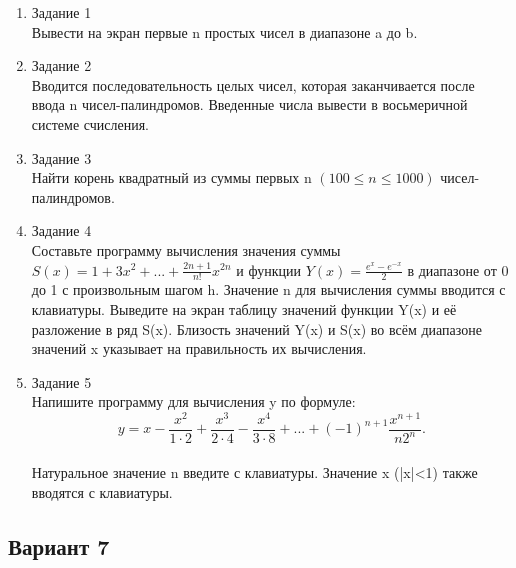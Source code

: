 \documentclass[a4paper]{article}
\begin{document}
	\begin{enumerate} 
		\item Задание 1 \\
			Вывести на экран первые n простых чисел в диапазоне a до b.\\
		\item Задание 2\\
			Вводится последовательность целых чисел, которая заканчивается после ввода n чисел-палиндромов.  
			Введенные числа вывести в восьмеричной системе счисления.\\
		\item Задание 3 \\
			Найти корень квадратный из суммы первых  n $(100 \le n \le 1000) $ чисел-палиндромов.\\
		\item Задание 4 \\
			Составьте программу вычисления значения суммы  $S(x)=1+3x^2+...+\frac{2n+1}{n!}x^{2n}$
			и функции $Y(x)=\frac{e^x-e^{-x}}{2}$ в диапазоне от 0 до 1
			с произвольным шагом h. Значение n для вычисления суммы вводится с клавиатуры. Выведите на экран таблицу значений функции Y(x) и её разложение в ряд S(x). Близость значений Y(x) и S(x) во всём диапазоне
			значений x указывает на правильность их вычисления.\\
		\item Задание 5 \\
			Напишите программу для вычисления y по формуле:\\
			$$y=x-\frac{x^2}{1\cdot2}+\frac{x^3}{2\cdot4}-\frac{x^4}{3\cdot8}+...+(-1)^{n+1}\frac{x^{n+1}}{n2^n}.$$\\
			Натуральное значение n введите с клавиатуры. Значение x (|x|<1) также вводятся с клавиатуры.\\
	\end{enumerate}
	\newpage
	\begin{center}
		\subsection*{Вариант 7}
	\end{center}
\end{document}
